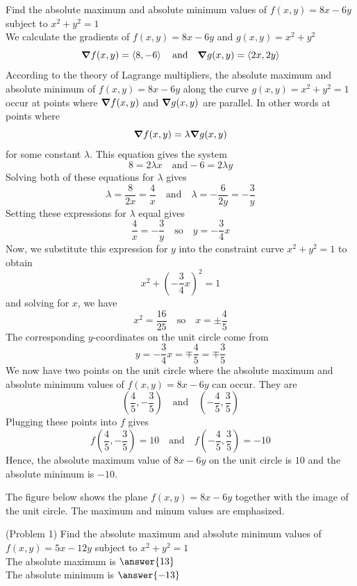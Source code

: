 \documentclass[handout]{ximera}
\begin{document}
\begin{example}[Example 1]
Find the absolute maximum and absolute minimum values of $f(x,y) = 8x - 6y$ subject to $x^2 + y^2 = 1$\\
We calculate the gradients of $f(x,y) = 8x - 6y$ and $g(x,y) = x^2 + y^2$
\[
\boldsymbol\nabla f(x,y) = \left\langle 8, -6\right\rangle \quad \text{and} \quad \boldsymbol\nabla g(x,y) = \left\langle 2x, 2y\right\rangle
\]
According to the theory of Lagrange multipliers, the absolute maximum and absolute minimum of $f(x,y) = 8x - 6y$
along the curve $g(x,y) = x^2 + y^2 = 1$ occur at points where $\boldsymbol\nabla f(x,y)$ and $\boldsymbol\nabla g(x,y)$ are parallel.  In other words at points where
\[
\boldsymbol\nabla f(x,y) = \lambda \boldsymbol\nabla g(x,y)
\]
for some constant $\lambda$.
This equation gives the system
\[
8 = 2\lambda x \quad \text{and} -6 = 2\lambda y
\]
Solving both of these equations for $\lambda$ gives
\[
\lambda = \frac{8}{2x} = \frac{4}{x} \quad \text{and} \quad \lambda = -\frac{6}{2y} = -\frac{3}{y}
\]
Setting these expressions for $\lambda$ equal gives
\[
\frac{4}{x} = -\frac{3}{y} \quad \text{so} \quad y = -\frac34 x
\]
Now, we substitute this expression for $y$ into the constraint curve $x^2 + y^2 = 1$ to obtain
\[
x^2 + \left(-\frac34 x\right)^2 = 1
\]
and solving for $x$, we have
\[
x^2 = \frac{16}{25} \quad \text{so} \quad x = \pm \frac45
\]
The corresponding $y$-coordinates on the unit circle come from 
\[
y = -\frac34 x = \mp \frac45 = \mp \frac35
\]
We now have two points on the unit circle where the absolute maximum and absolute minimum values of $f(x,y) = 8x - 6y$ can occur.
They are
\[
\left(\frac45, -\frac35\right) \quad \text{and} \quad \left(-\frac45, \frac35\right)
\]
Plugging these points into $f$ gives
\[
f\left(\frac45, -\frac35\right) = 10 \quad \text{and} \quad f\left(-\frac45, \frac35\right) = -10
\]
Hence, the absolute maximum value of $8x -6y$ on the unit circle is $10$ and the absolute minimum is $-10$.
\end{example}
The figure below shows the plane $f(x,y) = 8x-6y$ together with the image of the unit circle.
The maximum and minum values are emphasized.
\begin{center}
\end{center}


\begin{problem}(Problem 1)
Find the absolute maximum and absolute minimum values of $f(x,y) = 5x -12y$ subject to $x^2 + y^2 = 1$\\
The absolute maximum is $\answer{13}$\\
The absolute minimum is $\answer{-13}$
\end{problem}
\end{document}
